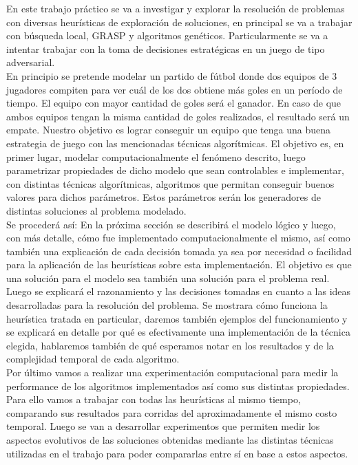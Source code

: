 
En este trabajo práctico se va a investigar y explorar la resolución de problemas con
diversas heurísticas de exploración de soluciones, en principal se va a trabajar
con búsqueda local, GRASP y algoritmos genéticos. Particularmente se va a intentar trabajar
con la toma de decisiones estratégicas en un juego de tipo adversarial.\\


En principio se pretende modelar un partido de fútbol donde dos equipos de 3
jugadores compiten para ver cuál de los dos obtiene más goles en un período de tiempo. El
equipo con mayor cantidad de goles será el ganador. En caso de que ambos equipos tengan
la misma cantidad de goles realizados, el resultado será un empate. Nuestro objetivo es lograr
conseguir un equipo que tenga una buena estrategia de juego con las mencionadas técnicas
algorítmicas. El objetivo es, en primer lugar, modelar computacionalmente el fenómeno descrito, luego
parametrizar propiedades de dicho modelo que sean controlables e implementar, con distintas técnicas
algorítmicas, algoritmos que permitan conseguir buenos valores para dichos parámetros. Estos parámetros
serán los generadores de distintas soluciones al problema modelado.
\\


Se procederá así:
En la próxima sección se describirá el modelo lógico y luego, con más detalle, cómo fue implementado
computacionalmente el mismo,
así como también una explicación de cada decisión tomada ya sea por necesidad o facilidad para
la aplicación de las heurísticas sobre esta implementación. El objetivo es que una solución
para el modelo sea también una solución para el problema real.
\\


Luego se explicará el razonamiento y las decisiones tomadas en cuanto a las ideas desarrolladas para
la resolución del problema. Se mostrara cómo funciona la heurística tratada en particular,
daremos también ejemplos del funcionamiento y se explicará en detalle por qué es
efectivamente una implementación de la técnica elegida, hablaremos también de qué esperamos notar
en los resultados y de la complejidad temporal de cada algoritmo.
\\


Por último vamos a realizar una experimentación computacional para medir la performance de
los algoritmos implementados así como sus distintas propiedades. Para ello vamos a trabajar con
todas las heurísticas al mismo tiempo, comparando sus resultados para corridas del aproximadamente
el mismo costo temporal. Luego se van a desarrollar experimentos que permiten medir los aspectos
evolutivos de las soluciones obtenidas mediante las distintas técnicas utilizadas en
el trabajo para poder compararlas entre sí en base a estos aspectos.\\
